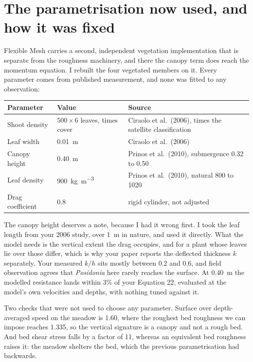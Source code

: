 \documentclass[11pt]{article}
\begin{document}
\section{The parametrisation now used, and how it was fixed}

Flexible Mesh carries a second, independent vegetation implementation that is
separate from the roughness machinery, and there the canopy term does reach the
momentum equation. I rebuilt the four vegetated members on it. Every parameter
comes from published measurement, and none was fitted to any observation:

\begin{center}
\begin{tabular}{llp{6.4cm}}
\toprule
Parameter & Value & Source \\
\midrule
Shoot density & $500 \times 6$ leaves, times cover & Ciraolo et al.\ (2006), times the satellite classification \\
Leaf width & \SI{0.01}{\metre} & Ciraolo et al.\ (2006) \\
Canopy height & \SI{0.40}{\metre} & Prinos et al.\ (2010), submergence 0.32 to 0.50 \\
Leaf density & \SI{900}{\kilo\gram\per\cubic\metre} & Prinos et al.\ (2010), natural 800 to 1020 \\
Drag coefficient & 0.8 & rigid cylinder, not adjusted \\
\bottomrule
\end{tabular}
\end{center}

The canopy height deserves a note, because I had it wrong first. I took the leaf
length from your 2006 study, over \SI{1}{\metre} in nature, and used it
directly. What the model needs is the vertical extent the drag occupies, and for
a plant whose leaves lie over those differ, which is why your paper reports the
deflected thickness $k$ separately. Your measured $k/h$ sits mostly between 0.2
and 0.6, and field observation agrees that \emph{Posidonia} here rarely reaches
the surface. At \SI{0.40}{\metre} the modelled resistance lands within 3\% of
your Equation 22, evaluated at the model's own velocities and depths, with
nothing tuned against it.

Two checks that were not used to choose any parameter. Surface over
depth-averaged speed on the meadow is 1.60, where the roughest bed roughness we
can impose reaches 1.335, so the vertical signature is a canopy and not a rough
bed. And bed shear stress falls by a factor of 11, whereas an equivalent bed
roughness raises it: the meadow shelters the bed, which the previous
parametrisation had backwards.
\end{document}
